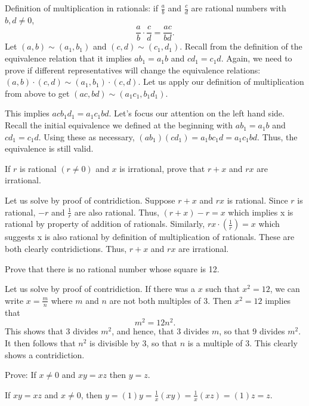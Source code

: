 \documentclass[12pt,letterpaper,boxed]{hmcpset}
\begin{document}
\begin{solution}
Definition of multiplication in rationals: if \(\frac{a}{b}\) and \(\frac{c}{d}\) are rational numbers with $b, d \neq 0$, 
$$ \frac{a}{b} \cdot \frac{c}{d}  = \frac{ac}{bd}.$$
Let $(a, b) \sim (a_1, b_1)$ and $(c, d) \sim (c_1, d_1)$. Recall from the definition of the equivalence relation that it implies $ab_1 = a_1b$ and $cd_1 = c_1d$. Again, we need to prove if different representatives will change the equivalence relations: $(a,b) \cdot (c,d) \sim (a_1, b_1) \cdot (c,d).$ Let us apply our definition of multiplication from above to get $(ac, bd) \sim (a_1c_1,b_1d_1).$

This implies $acb_1d_1 = a_1c_1bd.$ Let's focus our attention on the left hand side. Recall the initial equivalence we defined at the beginning with $ab_1 = a_1b$ and $cd_1 = c_1d$. Using these as necessary, $(ab_1)(cd_1) = a_1bc_1d = a_1c_1bd.$ Thus, the equivalence is still valid.
\end{solution}

\begin{problem}
If $r$ is rational $(r \neq 0)$ and $x$ is irrational, prove that $r + x$ and $rx$ are irrational.
\end{problem}

\begin{solution}
Let us solve by proof of contridiction. Suppose $r + x$ and $rx$ is rational. Since $r$ is rational, $-r$ and \(\frac{1}{r}\) are also rational. Thus, $(r + x) - r = x$ which implies x is rational by property of addition of rationals. 
Similarly, $rx \cdot (\frac{1}{r}) = x$ which suggests x is also rational by definition of multiplication of rationals. These are both clearly contridictions. Thus, $r + x$ and $rx$ are irrational.
\end{solution}

\begin{problem}
Prove that there is no rational number whose square is 12.
\end{problem}

\begin{solution}
Let us solve by proof of contridiction. If there was a $x$ such that $x^2 = 12$, we can write $x = \frac{m}{n}$ where $m$ and $n$ are not both multiples of 3. Then $x^2 = 12$ implies that
$$ m^2 = 12n^2.$$
This shows that 3 divides $m^2$, and hence, that 3 divides $m$, so that $9$ divides $m^2.$ It then follows that $n^2$ is divisible by 3, so that $n$ is a multiple of 3. This clearly shows a contridiction.

\end{solution}


\begin{problem}
Prove: If $x \neq 0$ and $xy = xz$ then $y = z.$
\end{problem}

\begin{solution}
If $xy = xz$ and $x \neq 0$, then $y = (1)y = \frac{1}{x}(xy) = \frac{1}{x}(xz) = (1)z = z.$
\end{solution}
\end{document}

